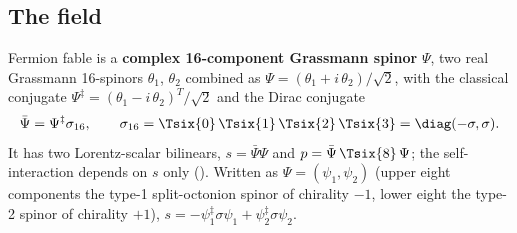 \subsection{The field}
\label{sec:3.1}

Fermion fable is a \textbf{complex 16-component Grassmann spinor} $\Psi$, two real Grassmann
16-spinors $\theta_1$, $\theta_2$ combined as $\Psi=(\theta_1+i\,\theta_2)/\sqrt2$, with the classical
conjugate $\Psi^{\ddagger}=(\theta_1-i\,\theta_2)^{T}/\sqrt2$ and the Dirac conjugate
\[
  \bar\Psi=\Psi^{\ddagger}\sigma_{16},\qquad
  \sigma_{16}=\Tsix{0}\,\Tsix{1}\,\Tsix{2}\,\Tsix{3}=\diag(-\sigma,\sigma) .
\]
It has two Lorentz-scalar bilinears, $s=\bar\Psi\Psi$ and $p=\bar\Psi\,\Tsix{8}\,\Psi$; the
self-interaction depends on $s$ only (). Written as $\Psi=(\psi_1,\psi_2)$ (upper eight
components the type-1 split-octonion spinor of chirality $-1$, lower eight the type-2 spinor of
chirality $+1$), $s=-\psi_1^{\ddagger}\sigma\psi_1+\psi_2^{\ddagger}\sigma\psi_2$.

